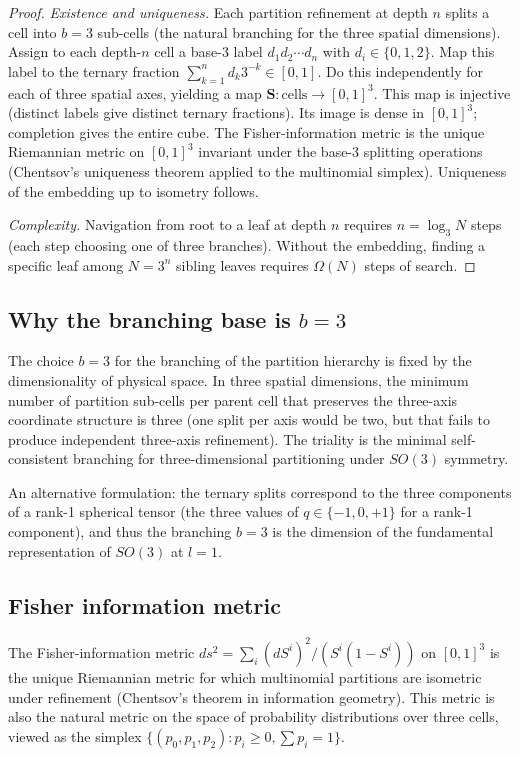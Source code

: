 \documentclass[11pt,twocolumn,a4paper]{article}
\theoremstyle{axiomstyle}
\theoremstyle{conseqstyle}
\theoremstyle{definition}
\theoremstyle{remark}
\begin{document}
\begin{proof}
\emph{Existence and uniqueness.} Each partition refinement at depth $n$ splits a cell into $b=3$ sub-cells (the natural branching for the three spatial dimensions). Assign to each depth-$n$ cell a base-3 label $d_{1}d_{2}\cdots d_{n}$ with $d_{i}\in\{0,1,2\}$. Map this label to the ternary fraction $\sum_{k=1}^{n}d_{k}3^{-k}\in[0,1]$. Do this independently for each of three spatial axes, yielding a map $\mathbf{S}\colon\mathrm{cells}\to[0,1]^{3}$. This map is injective (distinct labels give distinct ternary fractions). Its image is dense in $[0,1]^{3}$; completion gives the entire cube. The Fisher-information metric is the unique Riemannian metric on $[0,1]^{3}$ invariant under the base-3 splitting operations (Chentsov's uniqueness theorem applied to the multinomial simplex). Uniqueness of the embedding up to isometry follows.

\emph{Complexity.} Navigation from root to a leaf at depth $n$ requires $n=\log_{3}N$ steps (each step choosing one of three branches). Without the embedding, finding a specific leaf among $N=3^{n}$ sibling leaves requires $\Omega(N)$ steps of search.
\end{proof}

\subsection{Why the branching base is $b=3$}

The choice $b=3$ for the branching of the partition hierarchy is fixed by the dimensionality of physical space. In three spatial dimensions, the minimum number of partition sub-cells per parent cell that preserves the three-axis coordinate structure is three (one split per axis would be two, but that fails to produce independent three-axis refinement). The triality is the minimal self-consistent branching for three-dimensional partitioning under $SO(3)$ symmetry.

An alternative formulation: the ternary splits correspond to the three components of a rank-1 spherical tensor (the three values of $q\in\{-1,0,+1\}$ for a rank-1 component), and thus the branching $b=3$ is the dimension of the fundamental representation of $SO(3)$ at $l=1$.

\subsection{Fisher information metric}

The Fisher-information metric $ds^{2}=\sum_{i}(dS^{i})^{2}/(S^{i}(1-S^{i}))$ on $[0,1]^{3}$ is the unique Riemannian metric for which multinomial partitions are isometric under refinement (Chentsov's theorem in information geometry). This metric is also the natural metric on the space of probability distributions over three cells, viewed as the simplex $\{(p_{0},p_{1},p_{2}): p_{i}\ge 0, \sum p_{i}=1\}$.
\end{document}
